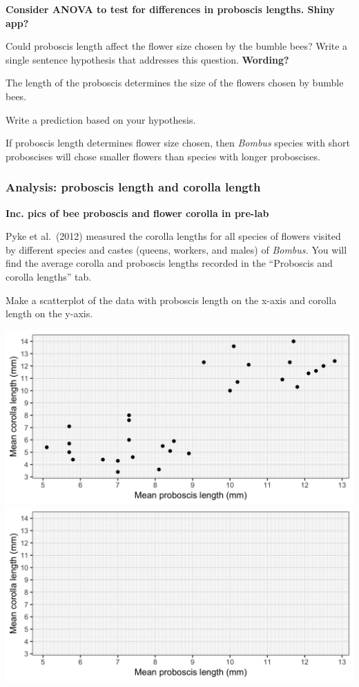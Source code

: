 \documentclass[12pt, hidelinks]{exam}
\newcommand*\AnswerBox[2]{%
    \parbox[t][#1]{0.92\textwidth}{%
    \begin{solution}#2\end{solution}}
    \vspace{\stretch{1}}
}
\begin{document}
\begin{questions}
\textbf{Consider ANOVA to test for differences in proboscis lengths. 
	Shiny app?}

\bigskip

\question
Could proboscis length affect the flower size chosen by the bumble bees? Write a single sentence hypothesis that addresses this question. \textbf{Wording?}

\AnswerBox{2\baselineskip}{The length of the proboscis determines the size
	of the flowers chosen by bumble bees.}

\question
Write a prediction based on your hypothesis.

\AnswerBox{3\baselineskip}{If proboscis length determines flower size chosen, then \textit{Bombus} species with short proboscises will chose smaller flowers than species with longer proboscises.}


\subsubsection*{Analysis: proboscis length and corolla length}\label{sec:proboscis_flower_length}

\textbf{Inc. pics of bee proboscis and flower corolla in pre-lab}

Pyke et al.~(2012) measured the corolla lengths for all species of flowers visited by different species and castes (queens, workers, and males) of \textit{Bombus.} You will find the average corolla and proboscis lengths recorded in the “Proboscis and corolla lengths” tab. 

\question
Make a scatterplot of the data with proboscis length on the x-axis and corolla length on the y-axis.

\ifprintanswers
	\includegraphics[width=\textwidth]{proboscis_corolla_key}
\else
	\includegraphics[width=\textwidth]{proboscis_corolla_blank}
\fi


\end{questions}
\end{document}
